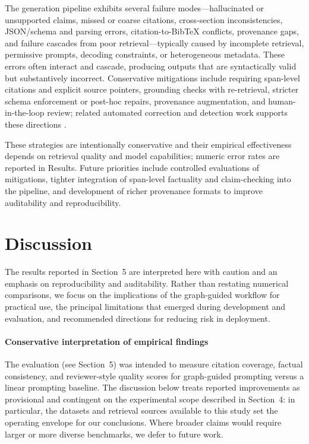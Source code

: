 \documentclass{article}%
\begin{document}
%
The generation pipeline exhibits several failure modes—hallucinated or unsupported claims, missed or coarse citations, cross-section inconsistencies, JSON/schema and parsing errors, citation-to-BibTeX conflicts, provenance gaps, and failure cascades from poor retrieval—typically caused by incomplete retrieval, permissive prompts, decoding constraints, or heterogeneous metadata. These errors often interact and cascade, producing outputs that are syntactically valid but substantively incorrect. Conservative mitigations include requiring span-level citations and explicit source pointers, grounding checks with re-retrieval, stricter schema enforcement or post-hoc repairs, provenance augmentation, and human-in-the-loop review; related automated correction and detection work supports these directions \cite{web_thorne_2021_evidence_based_factual_error_correction,web_bayat_2023_fleek_factual_error_detection_and_correction_wit,web_macavaney_2018_overcoming_low_utility_facets_for_complex_answer}.

These strategies are intentionally conservative and their empirical effectiveness depends on retrieval quality and model capabilities; numeric error rates are reported in Results. Future priorities include controlled evaluations of mitigations, tighter integration of span-level factuality and claim-checking into the pipeline, and development of richer provenance formats to improve auditability and reproducibility.%

%
\section{Discussion}%


%
The results reported in Section~5 are interpreted here with caution and an emphasis on reproducibility and auditability. Rather than restating numerical comparisons, we focus on the implications of the graph-guided workflow for practical use, the principal limitations that emerged during development and evaluation, and recommended directions for reducing risk in deployment.

\paragraph{Conservative interpretation of empirical findings}
The evaluation (see Section~5) was intended to measure citation coverage, factual consistency, and reviewer-style quality scores for graph-guided prompting versus a linear prompting baseline. The discussion below treats reported improvements as provisional and contingent on the experimental scope described in Section~4: in particular, the datasets and retrieval sources available to this study set the operating envelope for our conclusions. Where broader claims would require larger or more diverse benchmarks, we defer to future work.
\end{document}
